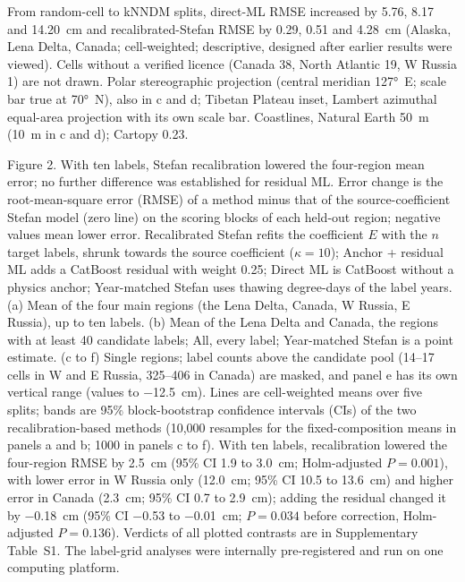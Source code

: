 From random-cell to kNNDM splits, direct-ML RMSE increased by 5.76, 8.17 and 14.20~cm and recalibrated-Stefan RMSE by 0.29, 0.51 and 4.28~cm (Alaska, Lena Delta, Canada; cell-weighted; descriptive, designed after earlier results were viewed).
Cells without a verified licence (Canada 38, North Atlantic 19, W Russia 1) are not drawn.
Polar stereographic projection (central meridian 127°~E; scale bar true at 70°~N), also in c and d; Tibetan Plateau inset, Lambert azimuthal equal-area projection with its own scale bar. Coastlines, Natural Earth 50~m (10~m in c and d); Cartopy 0.23.

\medskip

\noindent Figure 2. With ten labels, Stefan recalibration lowered the four-region mean error; no further difference was established for residual ML.
Error change is the root-mean-square error (RMSE) of a method minus that of the source-coefficient Stefan model (zero line) on the scoring blocks of each held-out region; negative values mean lower error.
Recalibrated Stefan refits the coefficient $E$ with the $n$ target labels, shrunk towards the source coefficient ($\kappa = 10$); Anchor + residual ML adds a CatBoost residual with weight 0.25; Direct ML is CatBoost without a physics anchor; Year-matched Stefan uses thawing degree-days of the label years.
(a) Mean of the four main regions (the Lena Delta, Canada, W Russia, E Russia), up to ten labels.
(b) Mean of the Lena Delta and Canada, the regions with at least 40 candidate labels; All, every label; Year-matched Stefan is a point estimate.
(c to f) Single regions; label counts above the candidate pool (14--17 cells in W and E Russia, 325--406 in Canada) are masked, and panel e has its own vertical range (values to −12.5~cm).
Lines are cell-weighted means over five splits; bands are 95\% block-bootstrap confidence intervals (CIs) of the two recalibration-based methods (10,000 resamples for the fixed-composition means in panels a and b; 1000 in panels c to f).
With ten labels, recalibration lowered the four-region RMSE by 2.5~cm (95\% CI 1.9 to 3.0~cm; Holm-adjusted $P = 0.001$), with lower error in W Russia only (12.0~cm; 95\% CI 10.5 to 13.6~cm) and higher error in Canada (2.3~cm; 95\% CI 0.7 to 2.9~cm); adding the residual changed it by −0.18~cm (95\% CI −0.53 to −0.01~cm; $P = 0.034$ before correction, Holm-adjusted $P = 0.136$).
Verdicts of all plotted contrasts are in Supplementary Table~S1.
The label-grid analyses were internally pre-registered and run on one computing platform.

